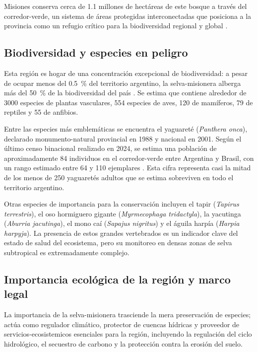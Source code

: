 \documentclass[a4paper, 12pt]{report}
\begin{document}
Misiones conserva cerca de \num{1.1} millones de hectáreas de este bosque a través
del \gls{corredor-verde}, un sistema de áreas protegidas interconectadas que
posiciona a la provincia como un refugio crítico para la biodiversidad
regional y global \cite{dibitetti2003yaguarete}.

\subsection{Biodiversidad y especies en peligro}

Esta región es hogar de una concentración excepcional de biodiversidad:
a pesar de ocupar menos del \qty{0.5}{\percent} del territorio argentino, la \gls{selva-misionera}
alberga más del \qty{50}{\percent} de la biodiversidad del país \cite{dibitetti2003yaguarete}.
Se estima que contiene alrededor de \num{3000} especies de plantas vasculares,
554 especies de aves, 120 de mamíferos, 79 de reptiles y 55 de anfibios.

Entre las especies más emblemáticas se encuentra el yaguareté (\textit{Panthera onca}),
declarado \gls{monumento-natural} provincial en 1988 y nacional en 2001. Según
el último censo binacional realizado en 2024, se estima una población de
aproximadamente \num{84} individuos en el \gls{corredor-verde} entre Argentina y
Brasil, con un rango estimado entre \num{64} y \num{110} ejemplares \cite{vidasilvestre2024censo}.
Esta cifra representa casi la mitad de los menos de 250 yaguaretés adultos
que se estima sobreviven en todo el territorio argentino.

Otras especies de importancia para la conservación incluyen el tapir
(\textit{Tapirus terrestris}), el oso hormiguero gigante (\textit{Myrmecophaga tridactyla}),
la yacutinga (\textit{Aburria jacutinga}), el mono caí (\textit{Sapajus nigritus})
y el águila harpía (\textit{Harpia harpyja}). La presencia de estos grandes
vertebrados es un indicador clave del estado de salud del ecosistema, pero su
monitoreo en densas zonas de selva subtropical es extremadamente complejo.

\subsection{Importancia ecológica de la región y marco legal}

La importancia de la \gls{selva-misionera} trasciende la mera preservación de
especies; actúa como regulador climático, protector de cuencas hídricas y
proveedor de \gls{servicios-ecosistemicos} esenciales para la región, incluyendo
la regulación del ciclo hidrológico, el secuestro de carbono y la protección
contra la erosión del suelo.
\end{document}
